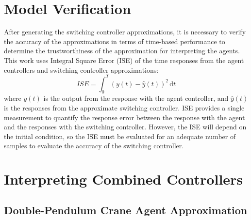 \section{Model Verification}

After generating the switching controller approximations, it is necessary to verify the accuracy of the approximations in terms of time-based performance to determine the trustworthiness of the approximation for interpreting the agents.
This work uses Integral Square Error (ISE) of the time responses from the agent controllers and switching controller approximations:
%
\begin{equation}
ISE = \int_0^T (y(t) - \hat{y}(t))^2 \, \text{d}t
\label{eq_chap5:ISE_func}
\end{equation}
%
where $y(t)$ is the output from the response with the agent controller, and $\hat{y}(t)$ is the responses from the approximate switching controller. ISE provides a single measurement to quantify the response error between the response with the agent and the responses with the switching controller. However, the ISE will depend on the initial condition, so the ISE must be evaluated for an adequate number of samples to evaluate the accuracy of the switching controller.

\section{Interpreting Combined Controllers}

\subsection{Double-Pendulum Crane Agent Approximation}

